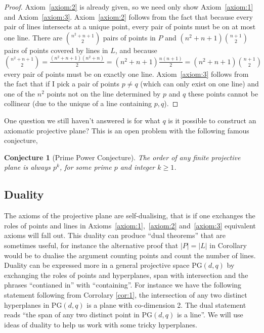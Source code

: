 \documentclass{article}
\newtheorem{conjecture}{Conjecture}
\newcommand{\PG}{\mathrm{PG}}
\begin{document}
    \begin{proof}
      Axiom~\ref{axiom:2} is already given, so we need only show Axiom~\ref{axiom:1} and Axiom~\ref{axiom:3}. Axiom~\ref{axiom:2} follows from the fact that because every pair of lines intersects at a unique point, every pair of points must be on at most one line. There are \(\binom{n^{2} + n + 1}{2}\) pairs of points in \(P\) and \((n^{2} + n + 1)\binom{n + 1}{2}\) pairs of points covered by lines in \(L\), and because \(\binom{n^{2} + n + 1}{2} = \frac{(n^{2} + n + 1)(n^{2} + n)}{2} = (n^{2} + n + 1)\frac{n(n + 1)}{2} = (n^{2} + n + 1)\binom{n + 1}{2}\) every pair of points must be on exactly one line. Axiom~\ref{axiom:3} follows from the fact that if I pick a pair of points \(p \ne q\) (which can only exist on one line) and one of the \(n^{2}\) points not on the line determined by \(p\) and \(q\) these points cannot be collinear (due to the unique of a line containing \(p,q\)).
    \end{proof}

    One question we still haven't answered is for what \(q\) is it possible to construct an axiomatic projective plane? This is an open problem with the following famous conjecture,

    \begin{conjecture}[Prime Power Conjecture]
        The order of any finite projective plane is always \(p^k\), for some prime \(p\) and integer \(k \geq 1\).
      \end{conjecture}

      \subsection{Duality}


      The axioms of the projective plane are self-dualising, that is if one exchanges the roles of points and lines in Axioms~\ref{axiom:1},~\ref{axiom:2} and~\ref{axiom:3} equivalent axioms will fall out. This duality can produce “dual theorems” that are sometimes useful, for instance the alternative proof
      that \(|P| = |L|\) in Corollary~\label{cor:p-count} would be to dualise the argument counting points and count the number of lines. Duality can be expressed more in a general projective space \(\PG(d,q)\) by exchanging the roles of points and hyperplanes, span with intersection and the phrases ``contianed in'' with ``containing''.
      For instance we have the following statement following from Corrolary \ref{cor:1}, the intersection of any two distinct hyperplanes in \(\PG(d, q)\) is a plane with co-dimension 2. The dual statement reads ``the span of any two distinct point in \(\PG(d, q)\) is a line''. We will use ideas of duality to help us work with some tricky hyperplanes.
\end{document}
